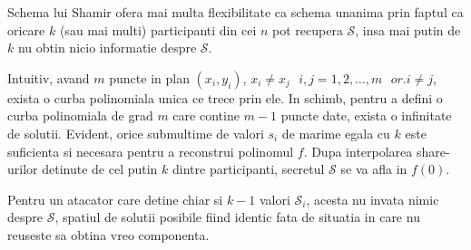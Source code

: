 \documentclass{llncs}
\begin{document}
Schema lui Shamir ofera mai multa flexibilitate ca schema unanima prin faptul ca oricare $k$ (sau mai multi) participanti
din cei $n$ pot recupera $\mathcal{S}$, insa mai putin de $k$ nu obtin nicio informatie despre $\mathcal{S}$.

Intuitiv, avand $m$ puncte in plan $(x_i, y_i)$, $x_i \neq x_j \text{ } i,j = 1, 2, \dots, m \text{ } or. i \neq j$, exista o curba polinomiala unica ce trece prin ele.  
In schimb, pentru a defini o curba polinomiala de grad $m$ care contine $m - 1$ puncte date, exista o infinitate de solutii.
Evident, orice submultime de valori $s_i$ de marime egala cu $k$ este suficienta si necesara pentru a reconstrui polinomul $f$. Dupa interpolarea share-urilor detinute de cel putin $k$ dintre participanti, secretul $\mathcal{S}$ se va afla in $f(0)$.

Pentru un atacator care detine chiar si $k-1$ valori $\mathcal{S}_i$, acesta nu invata nimic despre $\mathcal{S}$, spatiul de solutii posibile fiind identic fata de situatia in care nu reuseste sa obtina vreo componenta.
\end{document}
